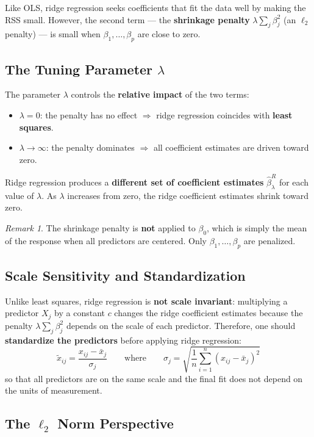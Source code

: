 \documentclass[11pt,a4paper]{article}
\theoremstyle{definition}
\theoremstyle{plain}
\theoremstyle{remark}
\newtheorem*{remark}{Remark}
\begin{document}
Like OLS, ridge regression seeks coefficients that fit the data well by making the RSS small. However, the second term --- the \textbf{shrinkage penalty} $\lambda \sum_j \beta_j^2$ (an $\ell_2$ penalty) --- is small when $\beta_1, \ldots, \beta_p$ are close to zero.

\subsection{The Tuning Parameter $\lambda$}

The parameter $\lambda$ controls the \textbf{relative impact} of the two terms:
\begin{itemize}
    \item $\lambda = 0$: the penalty has no effect $\Rightarrow$ ridge regression coincides with \textbf{least squares}.
    \item $\lambda \to \infty$: the penalty dominates $\Rightarrow$ all coefficient estimates are driven toward zero.
\end{itemize}
Ridge regression produces a \textbf{different set of coefficient estimates} $\hat{\beta}^R_\lambda$ for each value of $\lambda$. As $\lambda$ increases from zero, the ridge coefficient estimates shrink toward zero.

\begin{remark}
The shrinkage penalty is \textbf{not} applied to $\beta_0$, which is simply the mean of the response when all predictors are centered. Only $\beta_1, \ldots, \beta_p$ are penalized.
\end{remark}

\subsection{Scale Sensitivity and Standardization}

Unlike least squares, ridge regression is \textbf{not scale invariant}: multiplying a predictor $X_j$ by a constant $c$ changes the ridge coefficient estimates because the penalty $\lambda \sum_j \beta_j^2$ depends on the scale of each predictor. Therefore, one should \textbf{standardize the predictors} before applying ridge regression:
\[
    \tilde{x}_{ij} = \frac{x_{ij} - \bar{x}_j}{\sigma_j}
    \qquad \text{where} \qquad
    \sigma_j = \sqrt{\frac{1}{n}\sum_{i=1}^{n}(x_{ij} - \bar{x}_j)^2}
\]
so that all predictors are on the same scale and the final fit does not depend on the units of measurement.

\subsection{The $\ell_2$ Norm Perspective}
\end{document}
